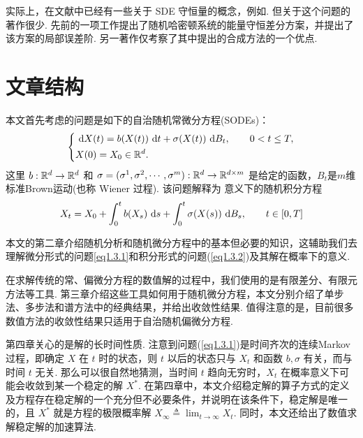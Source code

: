 实际上，在文献中已经有一些关于 SDE 守恒量的概念，例如\cite{zongshu19,zongshu25}. 但关于这个问题的著作很少. 先前的一项工作\cite{zongshu18}提出了随机哈密顿系统的能量守恒差分方案，并提出了该方案的局部误差阶. 另一著作\cite{zongshu20}仅考察了其中提出的合成方法的一个优点.	













\section{文章结构} 


本文首先考虑的问题是如下的自治随机常微分方程(SODEs)：
\begin{equation}\label{eq1.3.1}
\left\{
	\begin{aligned}
	& \text{ d} X(t) = b(X(t)) \text{ d} t + \sigma(X(t)) \text{ d} B_t,\qquad  0<t \le T,\\
	& X(0) = X_0 \in \mathbb{R}^d.
	\end{aligned}
\right.
\end{equation}
这里 $b:\mathbb{R}^d \to \mathbb{R}^d$ 和 $\sigma=(\sigma^1,\sigma^2,\cdots,\sigma^m):\mathbb{R}^d\to\mathbb{R}^{d \times m}$ 是给定的函数，$B_t$是$m$维标准Brown运动(也称 Wiener 过程). 该问题解释为 \ito 意义下的随机积分方程
\begin{equation}\label{eq1.3.2}
	X_t = X_0 + \int_0^t b(X_s) \text{ d} s + \int_0^t \sigma(X(s)) \text{ d} B_s,\qquad t\in[0,T]
\end{equation}


本文的第二章介绍随机分析和随机微分方程中的基本但必要的知识，这辅助我们去理解微分形式的问题\ref{eq1.3.1}和积分形式的问题(\ref{eq1.3.2})及其解在概率下的意义.

在求解传统的常、偏微分方程的数值解的过程中，我们使用的是有限差分、有限元方法等工具. 第三章介绍这些工具如何用于随机微分方程，本文分别介绍了单步法、多步法和谱方法中的经典结果，并给出收敛性结果. 值得注意的是，目前很多数值方法的收敛性结果只适用于自治随机偏微分方程.

第四章关心的是解的长时间性质. 注意到问题(\ref{eq1.3.1})是时间齐次的连续Markov过程，即确定 $X$ 在 $t$ 时的状态，则 $t$ 以后的状态只与 $X_t$ 和函数 $b,\sigma$ 有关，而与时间 $t$ 无关. 那么可以很自然地猜测，当时间 $t$ 趋向无穷时，$X_t$ 在概率意义下可能会收敛到某一个稳定的解 $X^*$. 在第四章中，本文介绍稳定解的算子方式的定义及方程存在稳定解的一个充分但不必要条件，并说明在该条件下，稳定解是唯一的，且 $X^*$ 就是方程的极限概率解 $X_\infty \triangleq \displaystyle \lim_{t\to\infty}X_t$. 同时，本文还给出了数值求解稳定解的加速算法. 

